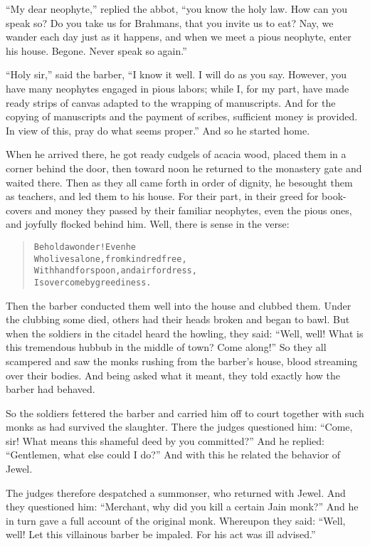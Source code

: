 \documentclass[article, twoside, 14pt]{memoir}
\renewenvironment{verbatim}{%
\begin{quote}%
\vskip -10pt%
\begin{alltt}\normalfont\large}{\end{alltt}%
\end{quote}%
\vskip -10pt
} %
\begin{document}
``My dear neophyte,'' replied the abbot,
``you know the holy law. How can you speak so? Do you take us for Brahmans, that you invite us to eat? Nay, we wander each day just as it happens, and when we meet a pious neophyte, enter his house. Begone. Never speak so again.''

``Holy sir,'' said the barber,
``I know it well. I will do as you say. However, you have many neophytes engaged in pious labors; while I, for my part, have made ready strips of canvas adapted to the wrapping of manuscripts. And for the copying of manuscripts and the payment of scribes, sufficient money is provided. In view of this, pray do what seems proper.''
And so he started home.

When he arrived there, he got ready cudgels of acacia wood,
placed them in a corner behind the door, then toward noon he
returned to the monastery gate and waited there. Then as they all
came forth in order of dignity, he besought them as teachers, and
led them to his house. For their part, in their greed for
book-covers and money they passed by their familiar neophytes, even
the pious ones, and joyfully flocked behind him. Well, there is
sense in the verse:

\begin{verbatim}
Behold a wonder! Even he
Who lives alone, from kindred free,
With hand for spoon, and air for dress,
Is overcome by greediness.
\end{verbatim}
Then the barber conducted them well into the house and clubbed
them. Under the clubbing some died, others had their heads broken
and began to bawl. But when the soldiers in the citadel heard the
howling, they said:
``Well, well! What is this tremendous hubbub in the middle of town? Come along!''
So they all scampered and saw the monks rushing from the barber's
house, blood streaming over their bodies. And being asked what it
meant, they told exactly how the barber had behaved.

So the soldiers fettered the barber and carried him off to court
together with such monks as had survived the slaughter. There the
judges questioned him:
``Come, sir! What means this shameful deed by you committed?'' And
he replied: ``Gentlemen, what else could I do?'' And with this he
related the behavior of Jewel.

The judges therefore despatched a summonser, who returned with
Jewel. And they questioned him:
``Merchant, why did you kill a certain Jain monk?'' And he in turn
gave a full account of the original monk. Whereupon they said:
``Well, well! Let this villainous barber be impaled. For his act was ill advised.''
\end{document}
